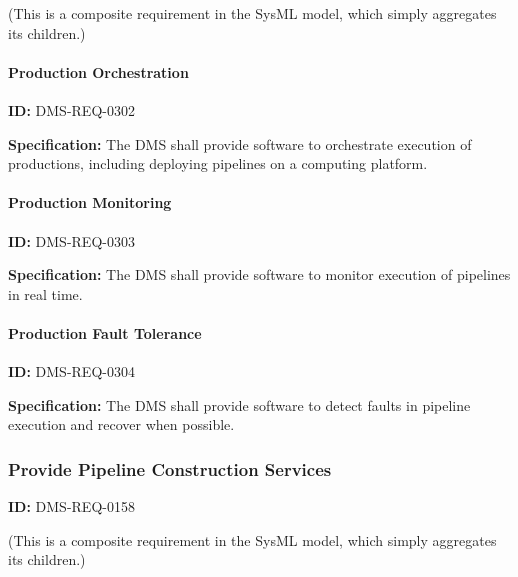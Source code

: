 \documentclass[SE,toc,lsstdraft]{lsstdoc}
\begin{document}
(This is a composite requirement in the SysML model, which simply aggregates its children.)




\paragraph{Production Orchestration}\hfill  %

\label{DMS-REQ-0302}
\textbf{ID:} DMS-REQ-0302

\textbf{Specification:} The DMS shall provide software to orchestrate execution of productions, including deploying pipelines on a computing platform.






\paragraph{Production Monitoring}\hfill  %

\label{DMS-REQ-0303}
\textbf{ID:} DMS-REQ-0303

\textbf{Specification:} The DMS shall provide software to monitor execution of pipelines in real time.






\paragraph{Production Fault Tolerance}\hfill  %

\label{DMS-REQ-0304}
\textbf{ID:} DMS-REQ-0304

\textbf{Specification:} The DMS shall provide software to detect faults in pipeline execution and recover when possible.






\subsubsection{Provide Pipeline Construction Services}

\label{DMS-REQ-0158}
\textbf{ID:} DMS-REQ-0158



(This is a composite requirement in the SysML model, which simply aggregates its children.)
\end{document}
